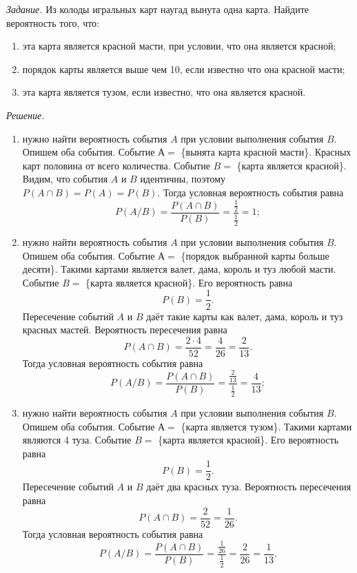 \textit{Задание.} Из колоды игральных карт наугад вынута одна карта.
Найдите вероятность того, что:
\begin{enumerate}[label=\alph*)]
\item эта карта является красной масти, при условии, что она является красной;
\item порядок карты является выше чем 10, если известно что она красной масти;
\item эта карта является тузом, если известно, что она является красной.
\end{enumerate}

\textit{Решение.} 
\begin{enumerate}[label=\alph*)]
\item нужно найти вероятность события $A$ при условии выполнения события $B$.
Опишем оба события.
Событие $А =$ \{вынята карта красной масти\}.
Красных карт половина от всего количества.
Событие $B =$ \{карта является красной\}.
Видим, что события $A$ и $B$ идентичны, поэтому $P \left( A \cap B \right) = P \left( A \right) = P \left( B \right)$.
Тогда условная вероятность события равна
$$P \left( A/B \right) =
\frac{P \left( A \cap B \right)}{P \left( B \right) } =
\frac{ \frac{1}{2} }{ \frac{1}{2} } =
1;$$
\item нужно найти вероятность события $A$ при условии выполнения события $B$.
Опишем оба события.
Событие $А =$ \{порядок выбранной карты больше десяти\}.
Такими картами является валет, дама, король и туз любой масти.
Событие $B =$ \{карта является красной\}.
Его вероятность равна
$$P \left( B \right) =
\frac{1}{2}.$$
Пересечение событий $A$ и $B$ даёт такие карты как валет, дама, король и туз красных мастей.
Вероятность пересечения равна
$$P \left( A \cap B \right) =
\frac{2 \cdot 4}{52} =
\frac{4}{26} =
\frac{2}{13}.$$
Тогда условная вероятность события равна
$$P \left( A/B \right) =
\frac{P \left( A \cap B \right)}{P \left( B \right) } =
\frac{ \frac{2}{13} }{ \frac{1}{2} } =
\frac{4}{13};$$
\item нужно найти вероятность события $A$ при условии выполнения события $B$.
Опишем оба события.
Событие $А =$ \{карта является тузом\}.
Такими картами являются 4 туза.
Событие $B =$ \{карта является красной\}.
Его вероятность равна
$$P \left( B \right) =
\frac{1}{2}.$$
Пересечение событий $A$ и $B$ даёт два красных туза.
Вероятность пересечения равна
$$P \left( A \cap B \right) =
\frac{2}{52} =
\frac{1}{26}.$$
Тогда условная вероятность события равна
$$P \left( A/B \right) =
\frac{P \left( A \cap B \right)}{P \left( B \right) } =
\frac{ \frac{1}{26} }{ \frac{1}{2} } =
\frac{2}{26} =
\frac{1}{13}.$$
\end{enumerate}


